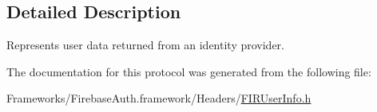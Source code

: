 \subsection{Detailed Description}
Represents user data returned from an identity provider. 

The documentation for this protocol was generated from the following file\+:\begin{DoxyCompactItemize}
\item 
Frameworks/\+Firebase\+Auth.\+framework/\+Headers/\hyperlink{_f_i_r_user_info_8h}{F\+I\+R\+User\+Info.\+h}\end{DoxyCompactItemize}
